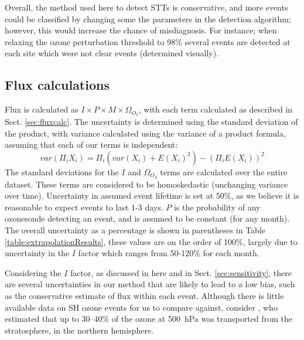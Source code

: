 \documentclass[acp, manuscript]{copernicus} %
\begin{document}
    Overall, the method used here to detect STTs is conservative, and more events could be classified by changing some the parameters in the detection algorithm; however, this would increase the chance of misdiagnosis. 
    For instance; when relaxing the ozone perturbation threshold to 98\% several events are detected at each site which were not clear events (determined visually).
    
  \subsection{Flux calculations}
    Flux is calculated as $ I \times P \times M \times \Omega_{O_3}$, with each term calculated as described in Sect. \ref{sec:fluxcalc}.
    The uncertainty is determined using the standard deviation of the product, with variance calculated using the variance of a product formula, assuming that each of our terms is independent: $$ var(\Pi_i X_i) = \Pi_i ( var(X_i) + E(X_i)^2 ) - (\Pi_i E(X_i))^2 $$
    The standard deviations for the $I$ and $\Omega_{O_3}$ terms are calculated over the entire dataset.
    These terms are considered to be homoskedastic (unchanging variance over time).
    Uncertainty in assumed event lifetime is set at 50\%, as we believe it is reasonable to expect events to last 1-3 days.
    $P$ is the probability of any ozonesonde detecting an event, and is assumed to be constant (for any month).
    The overall uncertainty as a percentage is shown in parentheses in Table \ref{table:extrapolationResults}, these values are on the order of 100\%, largely due to uncertainty in the $I$ factor which ranges from 50-120\% for each month.
    
    Considering the $I$ factor, as discussed in here and in Sect. \ref{sec:sensitivity}, there are several uncertainties in our method that are likely to lead to a low bias, such as the conservative estimate of flux within each event.
    Although there is little available data on SH ozone events for us to compare against, consider \citet{Terao2008}, who estimated that up to 30--40\% of the ozone at 500~hPa was transported from the stratosphere, in the northern hemisphere.
    
\end{document}
